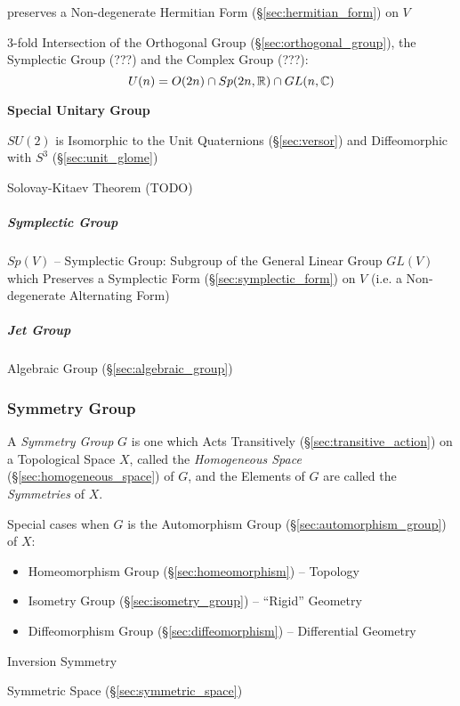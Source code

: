 preserves a Non-degenerate Hermitian Form (\S\ref{sec:hermitian_form}) on $V$

3-fold Intersection of the Orthogonal Group (\S\ref{sec:orthogonal_group}), the
Symplectic Group (???) and the Complex Group (???): %
\[
  U(n) = O(2n) \cap Sp(2n,\mathbb{R}) \cap GL(n,\mathbb{C})
\]



\textbf{Special Unitary Group}

$SU(2)$ is Isomorphic to the Unit Quaternions (\S\ref{sec:versor}) and
Diffeomorphic with $S^3$ (\S\ref{sec:unit_glome})

Solovay-Kitaev Theorem (TODO)



\subparagraph{Symplectic Group}\label{sec:symplectic_group}\hfill

$Sp(V)$ -- Symplectic Group: Subgroup of the General Linear Group $GL(V)$ which
Preserves a Symplectic Form (\S\ref{sec:symplectic_form}) on $V$ (i.e. a
Non-degenerate Alternating Form)



\subparagraph{Jet Group}\label{sec:jet_group}\hfill

Algebraic Group (\S\ref{sec:algebraic_group})



\subsubsection{Symmetry Group}\label{sec:symmetry_group}

A \emph{Symmetry Group} $G$ is one which Acts Transitively
(\S\ref{sec:transitive_action}) on a Topological Space $X$, called the
\emph{Homogeneous Space} (\S\ref{sec:homogeneous_space}) of $G$, and the
Elements of $G$ are called the \emph{Symmetries} of $X$.

Special cases when $G$ is the Automorphism Group
(\S\ref{sec:automorphism_group}) of $X$:
\begin{itemize}
  \item Homeomorphism Group (\S\ref{sec:homeomorphism}) -- Topology
  \item Isometry Group (\S\ref{sec:isometry_group}) -- ``Rigid'' Geometry
  \item Diffeomorphism Group (\S\ref{sec:diffeomorphism}) -- Differential
    Geometry
\end{itemize}

Inversion Symmetry %

\fist Symmetric Space (\S\ref{sec:symmetric_space})

